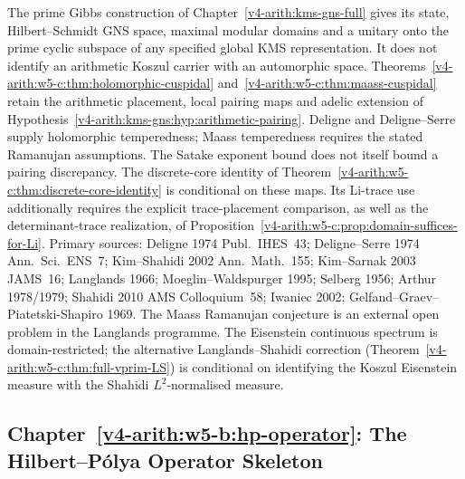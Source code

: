 The prime Gibbs construction of Chapter~\ref{v4-arith:kms-gns-full}
gives its state, Hilbert--Schmidt GNS space, maximal modular domains
and a unitary onto the prime cyclic subspace of any specified global
KMS representation. It does not identify an arithmetic Koszul
carrier with an automorphic space.
Theorems~\ref{v4-arith:w5-c:thm:holomorphic-cuspidal}
and~\ref{v4-arith:w5-c:thm:maass-cuspidal} retain the arithmetic
placement, local pairing maps and adelic extension of
Hypothesis~\ref{v4-arith:kms-gns:hyp:arithmetic-pairing}.
Deligne and Deligne--Serre supply holomorphic temperedness;
Maass temperedness requires the stated Ramanujan assumptions.
The Satake exponent bound does not itself bound a pairing discrepancy.
The discrete-core identity of
Theorem~\ref{v4-arith:w5-c:thm:discrete-core-identity} is conditional
on these maps. Its Li-trace use additionally requires the
explicit trace-placement comparison, as well as the determinant-trace
realization, of
Proposition~\ref{v4-arith:w5-c:prop:domain-suffices-for-Li}.
Primary sources: Deligne 1974 Publ.~IHES~43;
Deligne--Serre 1974 Ann.~Sci.~ENS~7; Kim--Shahidi 2002
Ann.~Math.~155; Kim--Sarnak 2003 JAMS~16; Langlands 1966;
Moeglin--Waldspurger 1995; Selberg 1956; Arthur 1978/1979;
Shahidi 2010 AMS Colloquium~58; Iwaniec 2002;
Gelfand--Graev--Piatetski-Shapiro 1969.
The Maass Ramanujan conjecture is an external open problem in the
Langlands programme. The Eisenstein continuous spectrum is
domain-restricted; the alternative Langlands--Shahidi correction
(Theorem~\ref{v4-arith:w5-c:thm:full-vprim-LS}) is conditional on identifying
the Koszul Eisenstein measure with the Shahidi \(L^{2}\)-normalised
measure.

\subsection{Chapter~\ref{v4-arith:w5-b:hp-operator}: The Hilbert--P\'{o}lya Operator Skeleton}
\label{v4-arith:w5-synth:ch56}

